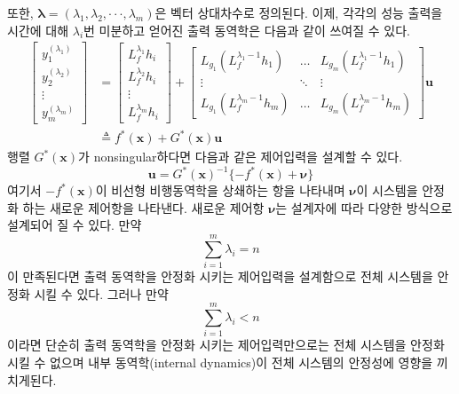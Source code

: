 \documentclass[a4paper, 12pt]{report}
\begin{document}
또한, $\boldsymbol{\lambda}=(\lambda_{1},\lambda_{2},\cdot\cdot\cdot,\lambda_{m})$은 벡터 상대차수로 정의된다. 이제, 각각의 성능 출력을 시간에 대해 $\lambda_{i}$번 미분하고 얻어진 출력 동역학은 다음과 같이 쓰여질 수 있다.
\begin{equation}\label{Eq:output_dyn}
  \begin{split}
     \begin{bmatrix}
       y_{1}^{(\lambda_{1})} \\
       y_{2}^{(\lambda_{2})} \\
       \vdots \\
       y_{m}^{(\lambda_{m})}
     \end{bmatrix}
       &=
     \begin{bmatrix}
       L_{f}^{\lambda_{1}}h_{i} \\
       L_{f}^{\lambda_{2}}h_{i} \\
       \vdots \\
       L_{f}^{\lambda_{m}}h_{i}
     \end{bmatrix}
     +
     \begin{bmatrix}
       L_{g_{1}}( L_{f}^{\lambda_{1}-1}h_{1} ) & \dots & L_{g_{m}}( L_{f}^{\lambda_{1}-1}h_{1} ) \\
       \vdots & \ddots & \vdots \\
       L_{g_{1}}( L_{f}^{\lambda_{m}-1}h_{m} ) & \dots & L_{g_{m}}( L_{f}^{\lambda_{m}-1}h_{m} )
     \end{bmatrix}
     \mathbf{u} \\
     &\triangleq f^{*}(\mathbf{x}) + G^{*}(\mathbf{x})\mathbf{u}
  \end{split}
\end{equation}
행렬 $G^{*}(\mathbf{x})$가 nonsingular하다면 다음과 같은 제어입력을 설계할 수 있다.
\begin{equation}\label{Eq:NDI_input1}
  \mathbf{u} = G^{*}(\mathbf{x})^{-1}\{ -f^{*}(\mathbf{x}) + \boldsymbol{\nu} \}
\end{equation}
여기서 $-f^{*}(\mathbf{x})$이 비선형 비행동역학을 상쇄하는 항을 나타내며 $\boldsymbol{\nu}$이 시스템을 안정화 하는 새로운 제어항을 나타낸다. 새로운 제어항 $\boldsymbol{\nu}$는 설계자에 따라 다양한 방식으로 설계되어 질 수 있다. 만약
\begin{equation}\label{Eq:rela_deg_full}
    \sum_{i=1}^{m}\lambda_{i} = n
\end{equation}
이 만족된다면 출력 동역학을 안정화 시키는 제어입력을 설계함으로 전체 시스템을 안정화 시킬 수 있다. 그러나 만약
\begin{equation}
    \sum_{i=1}^{m}\lambda_{i} < n
\end{equation}
이라면 단순히 출력 동역학을 안정화 시키는 제어입력만으로는 전체 시스템을 안정화 시킬 수 없으며 내부 동역학(internal dynamics)이 전체 시스템의 안정성에 영향을 끼치게된다.
\end{document}
